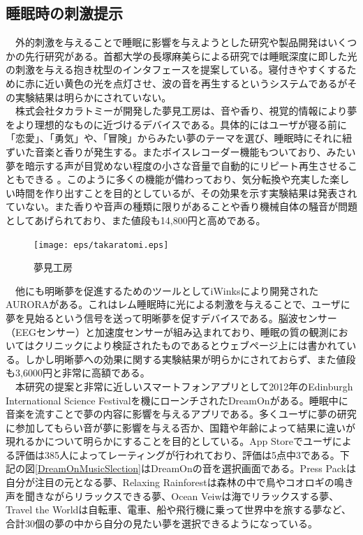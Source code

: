 \subsection{睡眠時の刺激提示}
　外的刺激を与えることで睡眠に影響を与えようとした研究や製品開発はいくつかの先行研究がある。首都大学の長塚麻美らによる研究では睡眠深度に即した光の刺激を与える抱き枕型のインタフェースを提案している\cite{sleepSheep}。寝付きやすくするために赤に近い黄色の光を点灯させ、波の音を再生するというシステムであるがその実験結果は明らかにされていない。\\
　株式会社タカラトミーが開発した夢見工房は、音や香り、視覚的情報により夢をより理想的なものに近づけるデバイスである。具体的にはユーザが寝る前に「恋愛」、「勇気」や、「冒険」からみたい夢のテーマを選び、睡眠時にそれに紐ずいた音楽と香りが発生する。またボイスレコーダー機能もついており、みたい夢を暗示する声が目覚めない程度の小さな音量で自動的にリピート再生させることもできる \cite{takaratomi}。このように多くの機能が備わっており、気分転換や充実した楽しい時間を作り出すことを目的としているが、その効果を示す実験結果は発表されていない。また香りや音声の種類に限りがあることや香り機械自体の騒音が問題としてあげられており、また値段も14,800円と高めである。\\
\begin{figure}[htbp]
\begin{center}
\texttt{[image: eps/takaratomi.eps]}
\caption{夢見工房}
\label{takaratomi}
\end{center}
\end{figure}
　他にも明晰夢を促進するためのツールとしてiWinksにより開発されたAURORAがある\cite{iWinks}。これはレム睡眠時に光による刺激を与えることで、ユーザに夢を見始るという信号を送って明晰夢を促すデバイスである。脳波センサー（EEGセンサー）と加速度センサーが組み込まれており、睡眠の質の観測においてはクリニックにより検証されたものであるとウェブページ上には書かれている。しかし明晰夢への効果に関する実験結果が明らかにされておらず、また値段も3,6000円と非常に高額である。\\
　本研究の提案と非常に近しいスマートフォンアプリとして2012年のEdinburgh International Science Festivalを機にローンチされたDreamOnがある。睡眠中に音楽を流すことで夢の内容に影響を与えるアプリである。多くユーザに夢の研究に参加してもらい音が夢に影響を与える否か、国籍や年齢によって結果に違いが現れるかについて明らかにすることを目的としている。App Storeでユーザによる評価は385人によってレーティングが行われており、評価は5点中3である。下記の図\ref{DreamOnMusicSlection}はDreamOnの音を選択画面である。Press Packは自分が注目の元となる夢、Relaxing Rainforestは森林の中で鳥やコオロギの鳴き声を聞きながらリラックスできる夢、Ocean Veiwは海でリラックスする夢、Travel the Worldは自転車、電車、船や飛行機に乗って世界中を旅する夢など、合計30個の夢の中から自分の見たい夢を選択できるようになっている。

